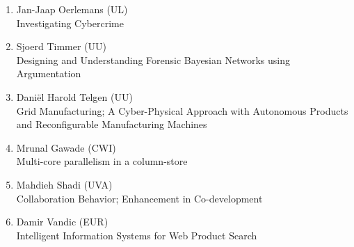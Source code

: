 \begin{multicols}{2}
\begin{scriptsize}
\begin{enumerate}[label=\textbf{2017-\arabic*},leftmargin=0cm,itemindent=1.15cm,labelwidth=\itemindent,labelsep=0cm,align=left,noitemsep]

\item Jan-Jaap Oerlemans (UL)    \\
	Investigating Cybercrime

\item Sjoerd Timmer (UU)   \\
	Designing and Understanding Forensic Bayesian Networks using Argumentation

\item Daniël Harold Telgen (UU)    \\
	Grid Manufacturing; A Cyber-Physical Approach with Autonomous Products and Reconfigurable Manufacturing Machines 
\item Mrunal Gawade (CWI)   \\
	Multi-core parallelism in a column-store
\item Mahdieh Shadi (UVA)    \\
	Collaboration Behavior; Enhancement in Co-development 
\item Damir Vandic (EUR)   \\
	Intelligent Information Systems for Web Product Search 


\end{enumerate}
\end{scriptsize}
\end{multicols}
